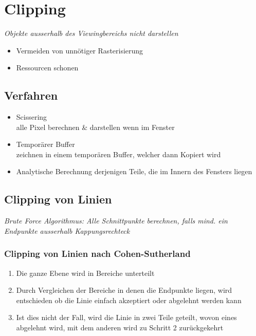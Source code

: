 \section{Clipping}

\textit{Objekte ausserhalb des Viewingbereichs nicht darstellen}

\begin{itemize}
	\item Vermeiden von unnötiger Rasterisierung
	\item Ressourcen schonen
\end{itemize}

\subsection{Verfahren}
\begin{itemize}
	\item Scissering \\
	alle Pixel berechnen \& darstellen wenn im Fenster
	
	\item Temporärer Buffer \\
	zeichnen in einem temporären Buffer, welcher dann Kopiert wird

	\item Analytische Berechnung derjenigen Teile, die im Innern des Fensters liegen

\end{itemize}

\subsection{Clipping von Linien}

\textit{Brute Force Algorithmus: Alle Schnittpunkte berechnen, falls mind. ein Endpunkte ausserhalb Kappungsrechteck}

\subsubsection{Clipping von Linien nach Cohen-Sutherland}


\begin{enumerate}
	\item Die ganze Ebene wird in Bereiche unterteilt
	\item Durch Vergleichen der Bereiche in denen die Endpunkte liegen, wird entschieden ob die Linie einfach akzeptiert oder abgelehnt werden kann
	\item Ist dies nicht der Fall, wird die Linie in zwei Teile geteilt, wovon eines abgelehnt wird, mit dem anderen wird zu Schritt 2 zurückgekehrt
\end{enumerate}

